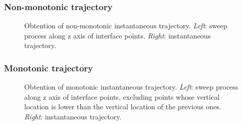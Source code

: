 \subsubsection*{Non-monotonic trajectory}


\begin{figure}[ht]
     \centering
     \begin{subfigure}[b]{0.45\textwidth}
         \centering
     \end{subfigure}
     \begin{subfigure}[b]{0.45\textwidth}
         \centering
     \end{subfigure}
        \caption{Obtention of non-monotonic instantaneous trajectory. \textsl{Left}: sweep process along z axis of interface points. \textsl{Right}: instantaneous trajectory.}
        \label{fig:trajectory_obtention_instantaneous_method_a}
\end{figure}


\subsubsection*{Monotonic trajectory}


\begin{figure}[ht]
     \centering
     \begin{subfigure}[b]{0.45\textwidth}
         \centering
     \end{subfigure}
     \begin{subfigure}[b]{0.45\textwidth}
         \centering
     \end{subfigure}
        \caption{Obtention of monotonic instantaneous trajectory. \textsl{Left}: sweep process along z axis of interface points, excluding points whose vertical location is lower than the vertical location of the previous ones. \textsl{Right}: instantaneous trajectory.}
        \label{fig:trajectory_obtention_instantaneous_method_b}
\end{figure}


